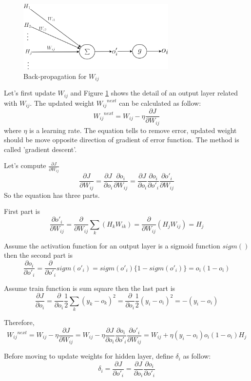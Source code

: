 \documentclass[draft,dvipsnames]{drexel-thesis}
\begin{document}
\begin{thesis}
\begin{figure}[t!]
    \centering
    \includegraphics[width=0.7\textwidth]{pictures/figures/BP1.png}
    \caption{Back-propagation for $W_{ij}$}
    \label{fig:BP1}
\end{figure}

Let's first update $W_{ij}$ and Figure \ref{fig:BP1} shows the detail of an output layer related with ${W_{ij}}$. The updated weight ${{W_{ij}}^{next}}$ can be calculated as follow:
$${{W_{ij}}^{next}}=W_{ij} - \eta\frac{\partial J}{\partial W_{ij}}$$ where $\eta$ is a learning rate. The equation tells to remove error, updated weight should be move opposite direction of gradient of error function. The method is called 'gradient descent'.

Let's compute $\frac{\partial J}{\partial W_{ij}}$
$$
\frac{\partial J}{\partial W_{ij}}
= \frac{\partial J}{\partial o_i}\frac{\partial o_i}{\partial W_{ij}}
= \frac{\partial J}{\partial o_i}\frac{\partial o_i}{\partial o'_i}\frac{\partial o'_i}{\partial W_{ij}}
$$
So the equation has three parts.

First part is
$$
\frac{\partial o'_i}{\partial W_{ij}}
= \frac{\partial}{\partial W_{ij}}\sum_k(H_kW_{ik})
= \frac{\partial}{\partial W_{ij}}(H_jW_{ij})
= H_j
$$

Assume the activation function for an output layer is a sigmoid function $sigm()$ then the second part is
$$
\frac{\partial o_i}{\partial o'_i}
= \frac{\partial}{\partial o'_i}sigm(o'_i)
= sigm(o'_i)\{1-sigm(o'_i)\}
= o_i(1-o_i)
$$

Assume train function is sum square then the last part is
$$
\frac{\partial J}{\partial o_i}
= \frac{\partial}{\partial o_i}\frac{1}{2}\sum_k(y_k-o_k)^2
= \frac{\partial}{\partial o_i}\frac{1}{2}(y_i-o_i)^2
= -(y_i-o_i)
$$

Therefore,
$$
{{W_{ij}}^{next}}
= W_{ij} - \eta\frac{\partial J}{\partial W_{ij}}
= W_{ij} - \eta\frac{\partial J}{\partial o_i}\frac{\partial o_i}{\partial o'_i}\frac{\partial o'_i}{\partial W_{ij}}
= W_{ij} + \eta(y_i-o_i)o_i(1-o_i)H_j
$$

Before moving to update weights for hidden layer, define $\delta_i$ as follow:
$$
\delta_i
= \frac{\partial J}{\partial o'_i}
= \frac{\partial J}{\partial o_i}\frac{\partial o_i}{\partial o'_i}
$$


\end{thesis}
\end{document}
